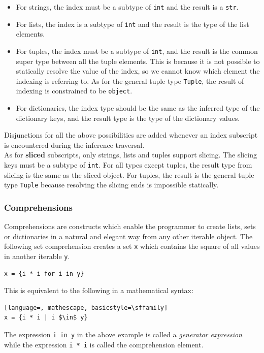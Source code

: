 \begin{itemize}
	\item For strings, the index must be a subtype of \lstinline|int| and the result is a \lstinline|str|.
	\item For lists, the index is a subtype of \lstinline|int| and the result is the type of the list elements.
	\item For tuples, the index must be a subtype of \lstinline|int|, and the result is the common super type between all the tuple elements. This is because it is not possible to statically resolve the value of the index, so we cannot know which element the indexing is referring to. As for the general tuple type \lstinline|Tuple|, the result of indexing is constrained to be \lstinline|object|.
	\item For dictionaries, the index type should be the same as the inferred type of the dictionary keys, and the result type is the type of the dictionary values.
\end{itemize}

Disjunctions for all the above possibilities are added whenever an index subscript is encountered during the inference traversal. \\

As for \textbf{sliced} subscripts, only strings, lists and tuples support slicing. The slicing keys must be a subtype of \lstinline|int|. For all types except tuples, the result type from slicing is the same as the sliced object. For tuples, the result is the general tuple type \lstinline|Tuple| because resolving the slicing ends is impossible statically.

\subsubsection{Comprehensions}
Comprehensions are constructs which enable the programmer to create lists, sets or dictionaries in a natural and elegant way from any other iterable object. The following set comprehension creates a set \lstinline|x| which contains the square of all values in another iterable \lstinline|y|.

\begin{lstlisting}
x = {i * i for i in y}
\end{lstlisting}

This is equivalent to the following in a mathematical syntax:
\begin{lstlisting}[language=, mathescape, basicstyle=\sffamily]
x = {i * i | i $\in$ y}
\end{lstlisting}
The expression \lstinline|i in y| in the above example is called a \textit{generator expression} while the expression \lstinline|i * i| is called the comprehension element.

